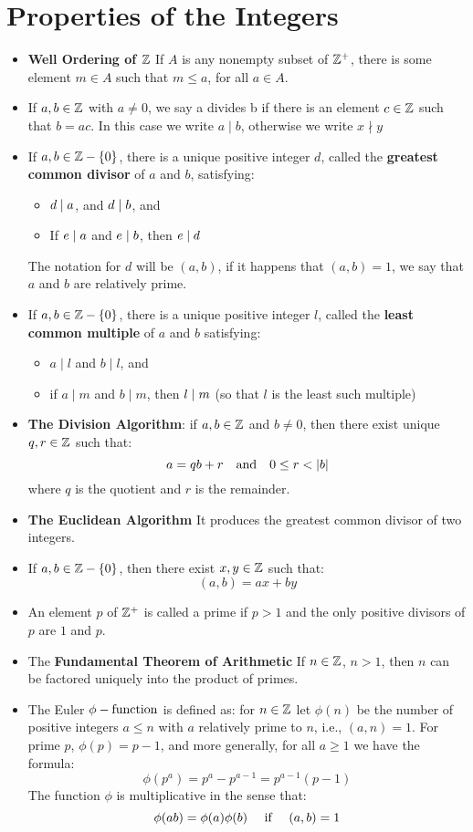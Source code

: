 \section{Properties of the Integers}
\begin{itemize}
	\item \textbf{Well Ordering of $ \mathbb{Z} $} If $A$ is any nonempty subset of $ \mathbb{Z}^+ $, there is some element $ m \in A$ such that $ m \leq a$, for all $a \in A $.
	\item If $ a, b \in \mathbb{Z} $ with $ a \neq 0 $, we say a divides b if there is an element $ c \in \mathbb{Z} $ such that $ b = ac$. In this case we write	$ a \mid b$, otherwise we write $ x \nmid y $
	\item If $a,b \in \mathbb{Z} - \left\lbrace 0 \right\rbrace $, there is a unique positive integer $d$, called the \textbf{greatest common divisor } of $a$ and $b$, satisfying:
	\begin{itemize}
		\item $ d \mid a$, and $ d \mid b$, and
		\item If $ e \mid a$ and $ e \mid b$, then $ e \mid d$ 
	\end{itemize} 
	The notation for $d$ will be $ (a,b) $, if it happens that $ (a,b) = 1 $, we say that $a$ and $b$ are relatively prime.
	\item If $a,b \in \mathbb{Z} - \left\lbrace 0 \right\rbrace $, there is a unique positive integer $l$, called the \textbf{least common multiple} of $a$ and $b$ satisfying:
	\begin{itemize}
		\item $ a \mid l$ and $ b \mid l$, and
		\item if $ a \mid m $ and $b \mid m$, then $ l \mid m$ (so that $l$ is the least such multiple)
	\end{itemize}
	\item \textbf{The Division Algorithm}: if $a,b \in \mathbb{Z} $ and $ b \neq 0 $, then there exist unique $q,r \in \mathbb{Z} $ such that:
	\[ a = qb + r \quad \textrm{and} \quad 0 \leq r < \left| b \right|\]
	where $q$ is the quotient and $r$ is the remainder.
	\item \textbf{The Euclidean Algorithm} It produces the greatest common divisor of two integers.
	\item If $a,b \in \mathbb{Z} - \left\lbrace 0 \right\rbrace $, then there exist $x,y  \in \mathbb{Z} $ such that:
	\[ (a,b) = ax + by \]
	\item An element $p$ of $ \mathbb{Z}^+ $ is called a prime if $ p > 1$ and the only positive divisors of $p$ are $1$ and $p$.
	\item The \textbf{Fundamental Theorem of Arithmetic} If $n \in \mathbb{Z}$, $ n > 1 $, then $n$ can be factored uniquely into the product of primes.
	\item The Euler $\phi-\textrm{function}$ is defined as: for $n \in \mathbb{Z} $ let $ \phi(n) $ be the number of positive integers $ a \leq n$ with $a$ relatively prime to $n$, i.e., $(a,n) =1$. For prime $p$, $ \phi(p) = p-1$, and more generally, for all $a \geq 1$ we have the formula:
	\[ \phi(p^a) = p^a - p^{a -1} = p^{a-1}(p-1)\]
	The function $ \phi $ is multiplicative in the sense that:
	\[ \phi(ab) = \phi(a)\phi(b) \quad \textrm{ if } \quad (a,b) = 1\]	
\end{itemize} 
